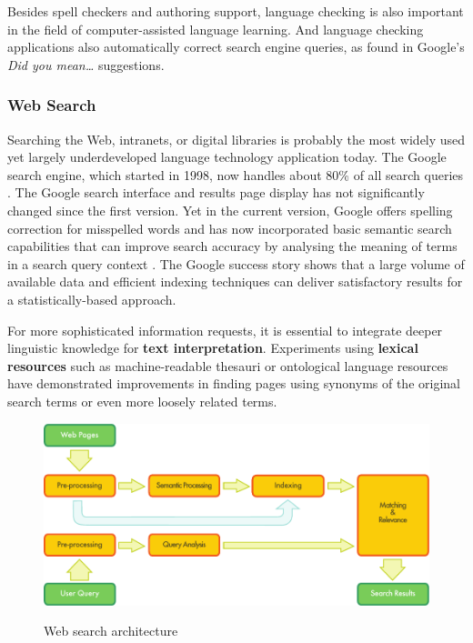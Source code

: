 \begin{multicols}{2}
Besides spell checkers and authoring support, language checking is also important in the field of computer-assisted language learning.
And language checking applications also automatically correct search engine queries, as found in Google's \textit{Did you mean\dots } suggestions.

\subsubsection{Web Search}

Searching the Web, intranets, or digital libraries is probably the most widely used yet largely underdeveloped language technology application today.  The Google search engine, which started in 1998, now handles about 80\% of all search queries \cite{Meta16}.  The Google search interface and results page display has not significantly changed since the first version.  Yet in the current version, Google offers spelling correction for misspelled words and has now incorporated basic semantic search capabilities that can improve search accuracy by analysing the meaning of terms in a search query context \cite{Meta17}.  The Google success story shows that a large volume of available data and efficient indexing techniques can deliver satisfactory results for a statistically-based approach.

For more sophisticated information requests, it is essential to integrate deeper linguistic knowledge for \textbf{text interpretation}.  Experiments using \textbf{lexical resources} such as machine-readable thesauri or ontological language resources have demonstrated improvements in finding pages using synonyms of the original search terms or even more loosely related terms.

\begin{figure}[htb]
  \center
  \includegraphics[width=\textwidth]{../_media/english/web_search_architecture}
  \caption{Web search architecture}
   \label{fig:websearcharch_en}
 \end{figure}


\end{multicols}
